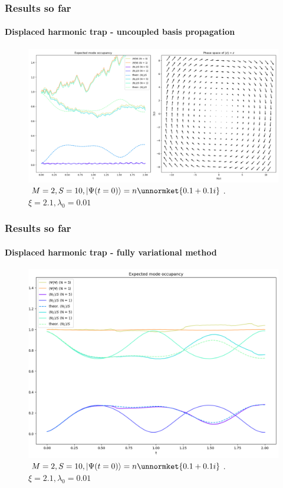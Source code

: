 \documentclass[english]{beamer}
\begin{document}
  \begin{frame}
  	\frametitle{Results so far}
  	\framesubtitle{Displaced harmonic trap - uncoupled basis propagation}
  	\begin{figure}
	\centering
    		\includegraphics[width=1\textwidth]{images/DHT_M=2_uncoupled_basis}
    		\caption{$M=2, S=10, \ket{\Psi(t=0)}=n\unnormket{0.1+0.1i}$. $\xi=2.1, \lambda_0=0.01$}
    		\label{fig:DHT2}
	\end{figure}
  \end{frame}
  
  \begin{frame}
  	\frametitle{Results so far}
  	\framesubtitle{Displaced harmonic trap - fully variational method}
  	\begin{figure}
	\centering
    		\includegraphics[width=1\textwidth]{images/DHT_M=2}
    		\caption{$M=2, S=10, \ket{\Psi(t=0)}=n\unnormket{0.1+0.1i}$. $\xi=2.1, \lambda_0=0.01$}
    		\label{fig:DHT2}
	\end{figure}
  \end{frame}
  
\end{document}
